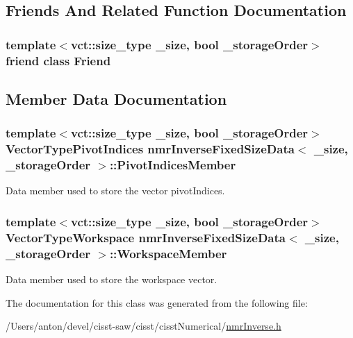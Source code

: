 \subsection{Friends And Related Function Documentation}
\hypertarget{classnmr_inverse_fixed_size_data_a7f8321d57e81bc613d5dbef3410ba70e}{}
\subsubsection[{Friend}]{\setlength{\rightskip}{0pt plus 5cm}template$<$vct\+::size\+\_\+type \+\_\+size, bool \+\_\+storage\+Order$>$ friend class {\bf Friend}\hspace{0.3cm}{\ttfamily [friend]}}\label{classnmr_inverse_fixed_size_data_a7f8321d57e81bc613d5dbef3410ba70e}


\subsection{Member Data Documentation}
\hypertarget{classnmr_inverse_fixed_size_data_aab37fa3e8096dc8ec9ac1b9098c34769}{}
\subsubsection[{Pivot\+Indices\+Member}]{\setlength{\rightskip}{0pt plus 5cm}template$<$vct\+::size\+\_\+type \+\_\+size, bool \+\_\+storage\+Order$>$ {\bf Vector\+Type\+Pivot\+Indices} {\bf nmr\+Inverse\+Fixed\+Size\+Data}$<$ \+\_\+size, \+\_\+storage\+Order $>$\+::Pivot\+Indices\+Member\hspace{0.3cm}{\ttfamily [protected]}}\label{classnmr_inverse_fixed_size_data_aab37fa3e8096dc8ec9ac1b9098c34769}
Data member used to store the vector pivot\+Indices. \hypertarget{classnmr_inverse_fixed_size_data_a701268b213e63dd44ad0a9869fc20e15}{}
\subsubsection[{Workspace\+Member}]{\setlength{\rightskip}{0pt plus 5cm}template$<$vct\+::size\+\_\+type \+\_\+size, bool \+\_\+storage\+Order$>$ {\bf Vector\+Type\+Workspace} {\bf nmr\+Inverse\+Fixed\+Size\+Data}$<$ \+\_\+size, \+\_\+storage\+Order $>$\+::Workspace\+Member\hspace{0.3cm}{\ttfamily [protected]}}\label{classnmr_inverse_fixed_size_data_a701268b213e63dd44ad0a9869fc20e15}
Data member used to store the workspace vector. 

The documentation for this class was generated from the following file\+:\begin{DoxyCompactItemize}
\item 
/\+Users/anton/devel/cisst-\/saw/cisst/cisst\+Numerical/\hyperlink{nmr_inverse_8h}{nmr\+Inverse.\+h}\end{DoxyCompactItemize}
